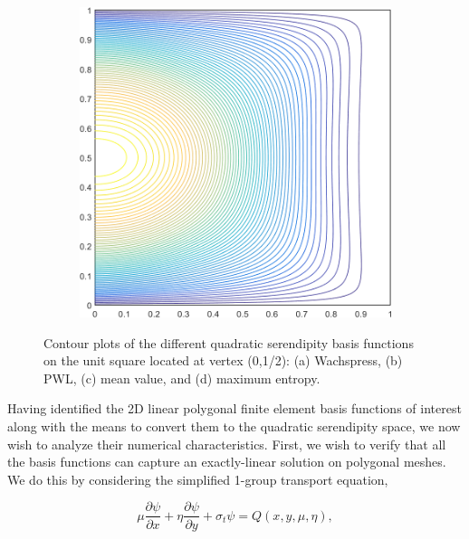 \documentclass[11pt]{article}
\begin{document}
\begin{figure}
\begin{subfigure}[b]{0.240\textwidth}
		\caption{}
	\end{subfigure}
	\hspace{1cm}
	\begin{subfigure}[b]{0.240\textwidth}
		\centering
		\includegraphics[width=\textwidth]{figures/square_MAXENT2_contour_b8.png}
		\caption{}
	\end{subfigure}
\caption{Contour plots of the different quadratic serendipity basis functions on the unit square located at vertex (0,1/2): (a) Wachspress, (b) PWL, (c) mean value, and (d) maximum entropy.}
\label{fig::2D_Quadratic_Summary_unit_square_basis_functions_b8}
\end{figure}

Having identified the 2D linear polygonal finite element basis functions of interest along with the means to convert them to the quadratic serendipity space, we now wish to analyze their numerical characteristics. First, we wish to verify that all the basis functions can capture an exactly-linear solution on polygonal meshes. We do this by considering the simplified 1-group transport equation,

\begin{equation}
\label{eq::lin_trans_eq}
\mu \frac{\partial  \psi}{\partial x} + \eta \frac{\partial  \psi}{\partial y} + \sigma_t \psi = Q(x,y,\mu,\eta),
\end{equation}
\end{document}
